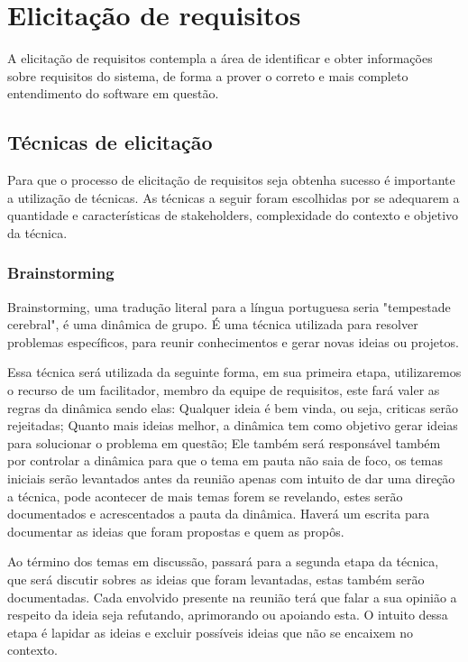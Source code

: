 \chapter[Elicitação de requisitos]{Elicitação de requisitos}
A elicitação de requisitos contempla a área de identificar e obter informações sobre requisitos do sistema, de forma a prover o correto e mais completo entendimento do software em questão.

\section{Técnicas de elicitação}
       
Para que o processo de elicitação de requisitos seja obtenha sucesso é importante a utilização de técnicas. As técnicas a seguir foram escolhidas por se adequarem a quantidade e características de stakeholders, complexidade do contexto e objetivo da técnica. 

\subsection{Brainstorming}
Brainstorming, uma tradução literal para a língua portuguesa seria "tempestade cerebral", é uma dinâmica de grupo. É uma técnica utilizada para resolver problemas específicos, para reunir conhecimentos e gerar novas ideias ou projetos\cite{leffingwell2011}.

Essa técnica será utilizada da seguinte forma, em sua primeira etapa, utilizaremos o recurso de um facilitador, membro da equipe de requisitos, este fará valer as regras da dinâmica sendo elas: Qualquer ideia é bem vinda, ou seja, criticas serão rejeitadas; Quanto mais ideias melhor, a dinâmica tem como objetivo gerar ideias para solucionar o problema em questão; Ele também será responsável também por controlar a dinâmica para que o tema em pauta não saia de foco, os temas iniciais serão levantados antes da reunião apenas com intuito de dar uma direção a técnica, pode acontecer de mais temas forem se revelando, estes serão documentados e acrescentados a pauta da dinâmica. Haverá um escrita para documentar as ideias que foram propostas e quem as propôs.

Ao término dos temas em discussão, passará para a segunda etapa da técnica, que será discutir sobres as ideias que foram levantadas, estas também serão documentadas. Cada envolvido presente na reunião terá que falar a sua opinião a respeito da ideia seja refutando,  aprimorando ou apoiando esta. O intuito dessa etapa é lapidar as ideias e excluir possíveis ideias que não se encaixem no contexto. 

